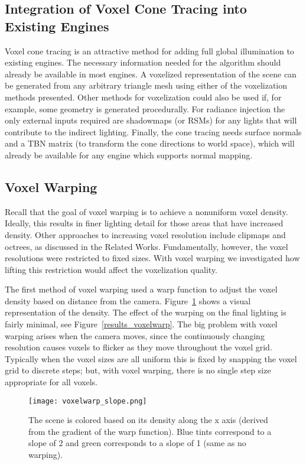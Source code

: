 \subsection{Integration of Voxel Cone Tracing into Existing Engines}
Voxel cone tracing is an attractive method for adding full global illumination to existing engines. The necessary information needed for the algorithm should already be available in most engines. A voxelized representation of the scene can be generated from any arbitrary triangle mesh using either of the voxelization methods presented. Other methods for voxelization could also be used if, for example, some geometry is generated procedurally. For radiance injection the only external inputs required are shadowmaps (or RSMs) for any lights that will contribute to the indirect lighting. Finally, the cone tracing needs surface normals and a TBN matrix (to transform the cone directions to world space), which will already be available for any engine which supports normal mapping.

\subsection{Voxel Warping}
Recall that the goal of voxel warping is to achieve a nonuniform voxel density. Ideally, this results in finer lighting detail for those areas that have increased density. Other approaches to increasing voxel resolution include clipmaps and octrees, as discussed in the Related Works. Fundamentally, however, the voxel resolutions were restricted to fixed sizes. With voxel warping we investigated how lifting this restriction would affect the voxelization quality.

The first method of voxel warping used a warp function to adjust the voxel density based on distance from the camera. Figure~\ref{fig:results_warpslope} shows a visual representation of the density. The effect of the warping on the final lighting is fairly minimal, see Figure~\ref{results_voxelwarp}. The big problem with voxel warping arises when the camera moves, since the continuously changing resolution causes voxels to flicker as they move throughout the voxel grid. Typically when the voxel sizes are all uniform this is fixed by snapping the voxel grid to discrete steps; but, with voxel warping, there is no single step size appropriate for all voxels.

\begin{figure}[h!]
    \centering
    \texttt{[image: voxelwarp\_slope.png]}
    \caption{The scene is colored based on its density along the x axis (derived from the gradient of the warp function). Blue tints correspond to a slope of 2 and green corresponds to a slope of 1 (same as no warping).}
    \label{fig:results_warpslope}
\end{figure}

